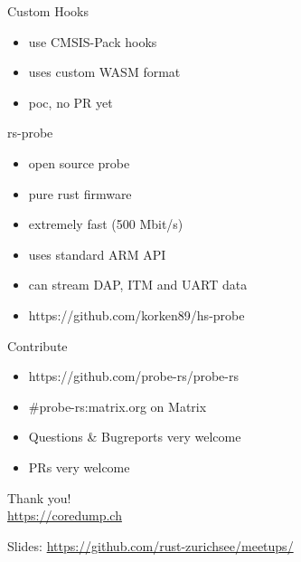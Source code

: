 \documentclass[aspectratio=1610,14pt,t]{beamer}
\begin{document}
\begin{frame}[c,fragile]{Custom Hooks}
  \begin{itemize}
    \item use CMSIS-Pack hooks
    \item uses custom WASM format
    \item poc, no PR yet
  \end{itemize}
\end{frame}

\begin{frame}[c,fragile]{rs-probe}
  \begin{itemize}
    \item open source probe
    \item pure rust firmware
    \item extremely fast (500 Mbit/s)
    \item uses standard ARM API
    \item can stream DAP, ITM and UART data
    \item https://github.com/korken89/hs-probe
  \end{itemize}
\end{frame}

\begin{frame}[c]{Contribute}
  \begin{itemize}
    \item https://github.com/probe-rs/probe-rs
    \item \#probe-rs:matrix.org on Matrix
    \item Questions \& Bugreports very welcome
    \item PRs very welcome
  \end{itemize}
\end{frame}


{
\begin{frame}[standout]
  \begin{centering}
    {\Huge Thank you!}\\
    {\normalsize \url{https://coredump.ch}}\\
  \end{centering}
  {\small Slides: \url{https://github.com/rust-zurichsee/meetups/}}\\
  \vspace{3cm}
\end{frame}
}
\end{document}
